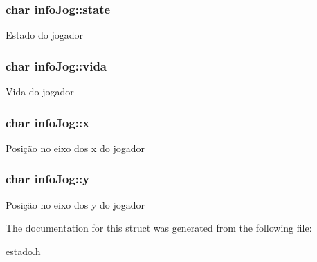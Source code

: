 \subsubsection[{\texorpdfstring{state}{state}}]{\setlength{\rightskip}{0pt plus 5cm}char info\+Jog\+::state}\hypertarget{structinfoJog_af55fd5b92e7b59ab6fc3f1151d37b187}{}\label{structinfoJog_af55fd5b92e7b59ab6fc3f1151d37b187}
Estado do jogador 
\subsubsection[{\texorpdfstring{vida}{vida}}]{\setlength{\rightskip}{0pt plus 5cm}char info\+Jog\+::vida}\hypertarget{structinfoJog_a69524d88bda21e0f2fbcff89a7aa9e9a}{}\label{structinfoJog_a69524d88bda21e0f2fbcff89a7aa9e9a}
Vida do jogador 
\subsubsection[{\texorpdfstring{x}{x}}]{\setlength{\rightskip}{0pt plus 5cm}char info\+Jog\+::x}\hypertarget{structinfoJog_a72412e2bd8636bf9bdec37137527b85f}{}\label{structinfoJog_a72412e2bd8636bf9bdec37137527b85f}
Posição no eixo dos x do jogador 
\subsubsection[{\texorpdfstring{y}{y}}]{\setlength{\rightskip}{0pt plus 5cm}char info\+Jog\+::y}\hypertarget{structinfoJog_a69479b69cebd2c57ae8c2420804cb74b}{}\label{structinfoJog_a69479b69cebd2c57ae8c2420804cb74b}
Posição no eixo dos y do jogador 

The documentation for this struct was generated from the following file\+:\begin{DoxyCompactItemize}
\item 
\hyperlink{estado_8h}{estado.\+h}\end{DoxyCompactItemize}
